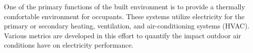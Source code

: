
One of the primary functions of the built environment is to provide a thermally comfortable environment for occupants. These systems utilize electricity for the primary or secondary heating, ventilation, and air-conditioning systems (HVAC). Various metrics are developed in this effort to quantify the impact outdoor air conditions have on electricity performance.
